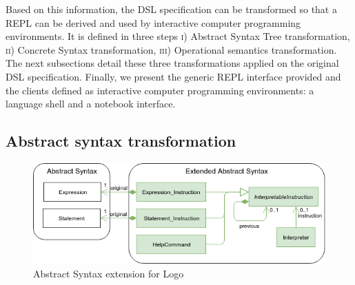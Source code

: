Based on this information, the DSL specification can be transformed so that a REPL can be derived and used by interactive computer programming environments. It is defined in three steps \textsc{i)} Abstract Syntax Tree transformation, \textsc{ii)} Concrete Syntax transformation, \textsc{iii)} Operational semantics transformation. The next subsections detail these three transformations applied on the original DSL specification. Finally, we present the generic REPL interface provided and the clients defined as interactive computer programming environments: a language shell and a notebook interface. 










\subsection{Abstract syntax transformation}

\begin{figure}[t]
	\centering
	\includegraphics[width=\linewidth]{figures/sle_abstract_syntax.png}
	\caption{Abstract Syntax extension for Logo}
	\label{fig:as}
\end{figure}


